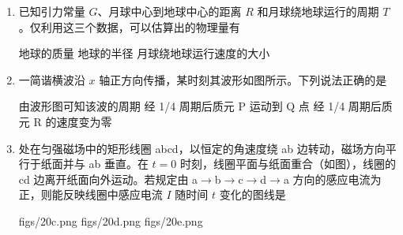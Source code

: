 \documentclass[\gkver]{gaokaozhenti}
\begin{document}
\begin{enumerate}

{三种}
{四种}
{五种}


\item
已知引力常量 $G$、月球中心到地球中心的距离 $R$ 和月球绕地球运行的周期 $T$。仅利用这三个数据，可以估算出的物理量有

{地球的质量}
{地球的半径}
{月球绕地球运行速度的大小}


\item
一简谐横波沿 $x$ 轴正方向传播，某时刻其波形如图所示。下列说法正确的是


{由波形图可知该波的周期}
{经 1/4 周期后质元 P 运动到 Q 点}
{经 1/4 周期后质元 R 的速度变为零}


\item
处在匀强磁场中的矩形线圈 abcd，以恒定的角速度绕 ab 边转动，磁场方向平行于纸面并与 ab 垂直。在 $t=0$ 时刻，线圈平面与纸面重合（如图），线圈的 cd 边离开纸面向外运动。若规定由 a$\to$b$\to$c$\to$d$\to$a 方向的感应电流为正，则能反映线圈中感应电流 $I$ 随时间 $t$ 变化的图线是


{figs/20c.png}
{figs/20d.png}
{figs/20e.png}



\end{enumerate}
\end{document}
